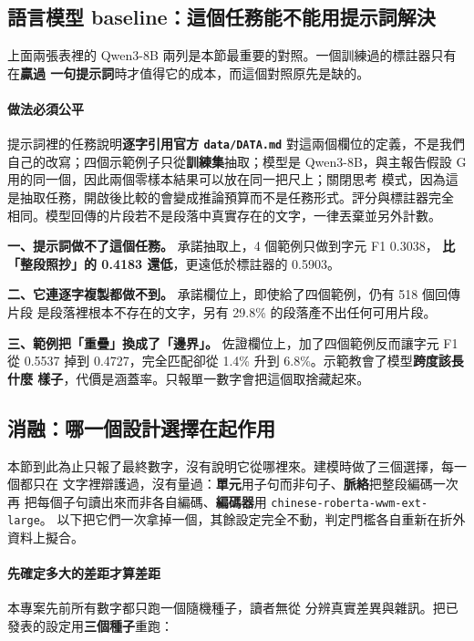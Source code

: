 \documentclass[11pt,a4paper]{ctexart}
\begin{document}
\subsection{語言模型 baseline：這個任務能不能用提示詞解決}
\label{sec:llmspan}

上面兩張表裡的 Qwen3-8B 兩列是本節最重要的對照。一個訓練過的標註器只有在\textbf{贏過
一句提示詞}時才值得它的成本，而這個對照原先是缺的。

\paragraph{做法必須公平} 提示詞裡的任務說明\textbf{逐字引用官方 \texttt{data/DATA.md}}
對這兩個欄位的定義，不是我們自己的改寫；四個示範例子只從\textbf{訓練集}抽取；模型是
Qwen3-8B，與主報告假設 G 用的同一個，因此兩個零樣本結果可以放在同一把尺上；關閉思考
模式，因為這是抽取任務，開啟後比較的會變成推論預算而不是任務形式。評分與標註器完全
相同。模型回傳的片段若不是段落中真實存在的文字，一律丟棄並另外計數。

\begin{tcolorbox}[colback=red!5, colframe=red!50, title=三個結論]
\textbf{一、提示詞做不了這個任務。} 承諾抽取上，4 個範例只做到字元 F1 0.3038，
\textbf{比「整段照抄」的 0.4183 還低}，更遠低於標註器的 0.5903。

\medskip
\textbf{二、它連逐字複製都做不到。} 承諾欄位上，即使給了四個範例，仍有 518 個回傳片段
是段落裡根本不存在的文字，另有 29.8\% 的段落產不出任何可用片段。

\medskip
\textbf{三、範例把「重疊」換成了「邊界」。} 佐證欄位上，加了四個範例反而讓字元 F1 從
0.5537 掉到 0.4727，完全匹配卻從 1.4\% 升到 6.8\%。示範教會了模型\textbf{跨度該長什麼
樣子}，代價是涵蓋率。只報單一數字會把這個取捨藏起來。
\end{tcolorbox}

\subsection{消融：哪一個設計選擇在起作用}
\label{sec:ablation}

本節到此為止只報了最終數字，沒有說明它從哪裡來。建模時做了三個選擇，每一個都只在
文字裡辯護過，沒有量過：\textbf{單元}用子句而非句子、\textbf{脈絡}把整段編碼一次再
把每個子句讀出來而非各自編碼、\textbf{編碼器}用 \texttt{chinese-roberta-wwm-ext-large}。
以下把它們一次拿掉一個，其餘設定完全不動，判定門檻各自重新在折外資料上擬合。

\paragraph{先確定多大的差距才算差距} 本專案先前所有數字都只跑一個隨機種子，讀者無從
分辨真實差異與雜訊。把已發表的設定用\textbf{三個種子}重跑：
\end{document}
